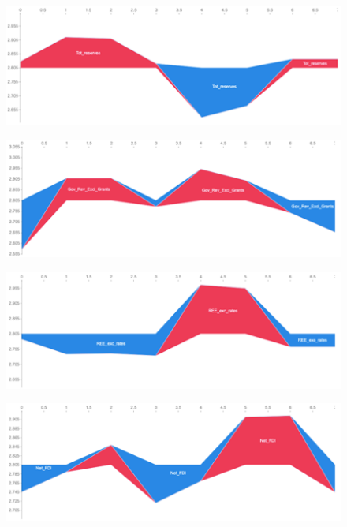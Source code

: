 \documentclass[12pt,italian, twoside]{report}
\begin{document}
\begin{figure}[t]
	\centering
	\includegraphics[width = 150mm]{immagini/tr.png}
\end{figure}
\begin{figure}[t]
	\centering
	\includegraphics[width = 150mm]{immagini/gr.png}
\end{figure}
\begin{figure}[t]
	\centering
	\includegraphics[width = 150mm]{immagini/ree.png}
\end{figure}
\begin{figure}[t]
	\centering
	\includegraphics[width = 150mm]{immagini/fdi.png}
\end{figure}
\end{document}

